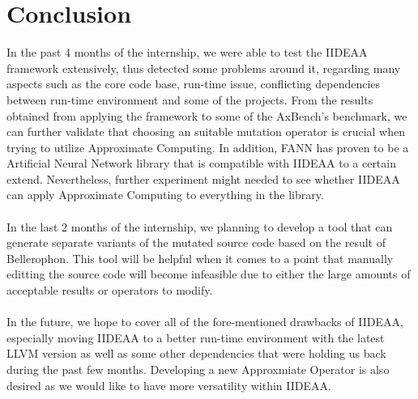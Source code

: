 \chapter{Conclusion}

In the past 4 months of the internship, we were able to test the IIDEAA framework extensively, thus detected some problems around it, regarding many aspects such as the core code base, run-time issue, conflicting dependencies between run-time environment and some of the projects. From the results obtained from applying the framework to some of the AxBench's benchmark, we can further validate that choosing an suitable mutation operator is crucial when trying to utilize Approximate Computing. In addition, FANN has proven to be a Artificial Neural Network library that is compatible with IIDEAA to a certain extend. Nevertheless, further experiment might needed to see whether IIDEAA can apply Approximate Computing to everything in the library. \\
~\\
In the last 2 months of the internship, we planning to develop a tool that can generate separate variants of the mutated source code based on the result of Bellerophon. This tool will be helpful when it comes to a point that manually editting the source code will become infeasible due to either the large amounts of acceptable results or operators to modify. \\
~\\
In the future, we hope to cover all of the fore-mentioned drawbacks of IIDEAA, especially moving IIDEAA to a better run-time environment with the latest LLVM version as well as some other dependencies that were holding us back during the past few months. Developing a new Approxmiate Operator is also desired as we would like to have more versatility within IIDEAA.\\